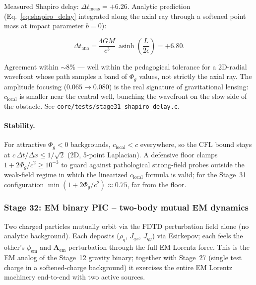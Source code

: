 \documentclass[11pt,a4paper]{article}
\newcommand{\vv}[1]{\mathbf{#1}}
\newcommand{\Phig}{\Phi_g}
\begin{document}
Measured Shapiro delay: $\Delta t_{\mathrm{meas}} = +6.26$.  Analytic
prediction (Eq.~\ref{eq:shapiro_delay} integrated along the axial ray
through a softened point mass at impact parameter $b = 0$):

\begin{equation}
  \Delta t_{\mathrm{ana}} = \frac{4 G M}{c^3}\,
    \operatorname{asinh}\!\left(\frac{L}{2 \epsilon}\right) = +6.80.
\end{equation}

Agreement within $\sim 8\%$ --- well within the pedagogical tolerance for
a 2D-radial wavefront whose path samples a band of $\Phig$ values, not
strictly the axial ray.  The amplitude focusing ($0.065 \to 0.080$) is
the real signature of gravitational lensing: $c_{\mathrm{local}}$ is
smaller near the central well, bunching the wavefront on the slow side
of the obstacle.  See \texttt{core/tests/stage31\_shapiro\_delay.c}.

\paragraph{Stability.}  For attractive $\Phig < 0$ backgrounds,
$c_{\mathrm{local}} < c$ everywhere, so the CFL bound stays at
$c\,\Delta t / \Delta x \le 1/\sqrt{2}$ (2D, 5-point Laplacian).
A defensive floor clamps $1 + 2\Phig/c^2 \ge 10^{-3}$ to guard against
pathological strong-field probes outside the weak-field regime in
which the linearized $c_{\mathrm{local}}$ formula is valid; for the
Stage~31 configuration $\min(1 + 2\Phig/c^2) \approx 0.75$, far from
the floor.

\subsubsection{Stage 32: EM binary PIC -- two-body mutual EM dynamics}
\label{sec:stage_em_binary_pic}

Two charged particles mutually orbit via the FDTD perturbation field
alone (no analytic background).  Each deposits ($\rho_q$, $J_{qx}$,
$J_{qy}$) via Esirkepov; each feels the other's $\phi_{\mathrm{em}}$
and $\vv{A}_{\mathrm{em}}$ perturbation through the full EM Lorentz
force.  This is the EM analog of the Stage~12 gravity binary; together
with Stage~27 (single test charge in a softened-charge background) it
exercises the entire EM Lorentz machinery end-to-end with two active
sources.
\end{document}
